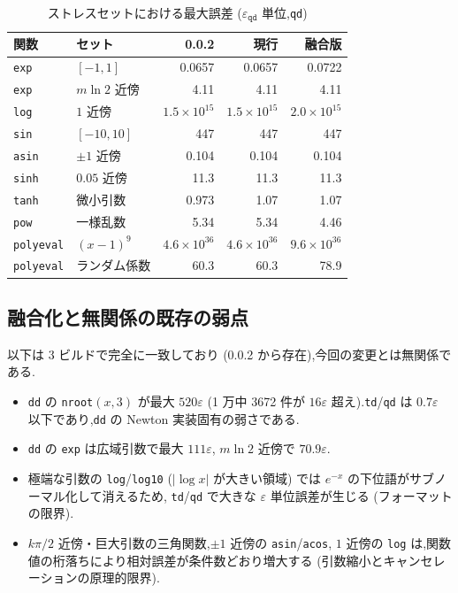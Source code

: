 \documentclass[a4paper,10pt]{ltjsarticle}
\begin{document}
\begin{table}[htbp]
\centering
\caption{ストレスセットにおける最大誤差 ($\varepsilon_{\texttt{qd}}$ 単位,\texttt{qd})}
\label{tab:accsum}
\begin{tabular}{ll rrr}
\toprule
関数 & セット & 0.0.2 & 現行 & 融合版 \\
\midrule
\texttt{exp} & $[-1,1]$ & 0.0657 & 0.0657 & 0.0722 \\
\texttt{exp} & $m\ln 2$ 近傍 & 4.11 & 4.11 & 4.11 \\
\texttt{log} & $1$ 近傍 & $1.5\times10^{15}$ & $1.5\times10^{15}$ & $2.0\times10^{15}$ \\
\texttt{sin} & $[-10,10]$ & 447 & 447 & 447 \\
\texttt{asin} & $\pm1$ 近傍 & 0.104 & 0.104 & 0.104 \\
\texttt{sinh} & $0.05$ 近傍 & 11.3 & 11.3 & 11.3 \\
\texttt{tanh} & 微小引数 & 0.973 & 1.07 & 1.07 \\
\texttt{pow} & 一様乱数 & 5.34 & 5.34 & 4.46 \\
\texttt{polyeval} & $(x-1)^9$ & $4.6\times10^{36}$ & $4.6\times10^{36}$ & $9.6\times10^{36}$ \\
\texttt{polyeval} & ランダム係数 & 60.3 & 60.3 & 78.9 \\
\bottomrule
\end{tabular}
\end{table}

\subsection{融合化と無関係の既存の弱点}

以下は 3 ビルドで完全に一致しており (0.0.2 から存在),今回の変更とは無関係である.

\begin{itemize}
  \item \texttt{dd} の \texttt{nroot}$(x,3)$ が最大 $520\varepsilon$
        (1 万中 3672 件が $16\varepsilon$ 超え).\texttt{td}/\texttt{qd} は
        $0.7\varepsilon$ 以下であり,\texttt{dd} の Newton 実装固有の弱さである.
  \item \texttt{dd} の \texttt{exp} は広域引数で最大 $111\varepsilon$,
        $m\ln 2$ 近傍で $70.9\varepsilon$.
  \item 極端な引数の \texttt{log}/\texttt{log10} ($|\log x|$ が大きい領域) では
        $e^{-x}$ の下位語がサブノーマル化して消えるため,
        \texttt{td}/\texttt{qd} で大きな $\varepsilon$ 単位誤差が生じる (フォーマットの限界).
  \item $k\pi/2$ 近傍・巨大引数の三角関数,$\pm1$ 近傍の \texttt{asin}/\texttt{acos},
        $1$ 近傍の \texttt{log} は,関数値の桁落ちにより相対誤差が条件数どおり増大する
        (引数縮小とキャンセレーションの原理的限界).
\end{itemize}
\end{document}
